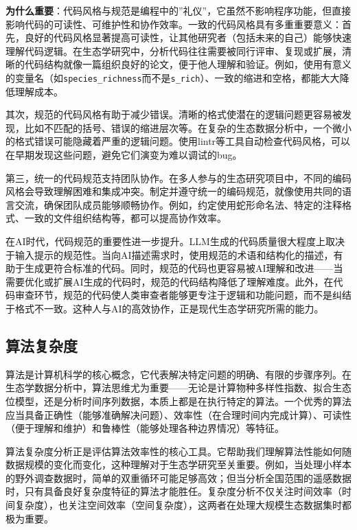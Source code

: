 \documentclass[
  twoside]{book}
\begin{document}
\textbf{为什么重要}：代码风格与规范是编程中的''礼仪''，它虽然不影响程序功能，但直接影响代码的可读性、可维护性和协作效率。一致的代码风格具有多重重要意义：首先，良好的代码风格显著提高可读性，让其他研究者（包括未来的自己）能够快速理解代码逻辑。在生态学研究中，分析代码往往需要被同行评审、复现或扩展，清晰的代码结构就像一篇组织良好的论文，便于他人理解和验证。例如，使用有意义的变量名（如\texttt{species\_richness}而不是\texttt{s\_rich}）、一致的缩进和空格，都能大大降低理解成本。

其次，规范的代码风格有助于减少错误。清晰的格式使潜在的逻辑问题更容易被发现，比如不匹配的括号、错误的缩进层次等。在复杂的生态数据分析中，一个微小的格式错误可能隐藏着严重的逻辑问题。使用lintr等工具自动检查代码风格，可以在早期发现这些问题，避免它们演变为难以调试的bug。

第三，统一的代码规范支持团队协作。在多人参与的生态研究项目中，不同的编码风格会导致理解困难和集成冲突。制定并遵守统一的编码规范，就像使用共同的语言交流，确保团队成员能够顺畅协作。例如，约定使用蛇形命名法、特定的注释格式、一致的文件组织结构等，都可以提高协作效率。

在AI时代，代码规范的重要性进一步提升。LLM生成的代码质量很大程度上取决于输入提示的规范性。当向AI描述需求时，使用规范的术语和结构化的描述，有助于生成更符合标准的代码。同时，规范的代码也更容易被AI理解和改进------当需要优化或扩展AI生成的代码时，规范的代码结构降低了理解难度。此外，在代码审查环节，规范的代码使人类审查者能够更专注于逻辑和功能问题，而不是纠结于格式不一致。这种人与AI的高效协作，正是现代生态学研究所需的能力。

\hypertarget{ux7b97ux6cd5ux590dux6742ux5ea6}{%
\subsection{算法复杂度}\label{ux7b97ux6cd5ux590dux6742ux5ea6}}

算法是计算机科学的核心概念，它代表解决特定问题的明确、有限的步骤序列。在生态学数据分析中，算法思维尤为重要------无论是计算物种多样性指数、拟合生态位模型，还是分析时间序列数据，本质上都是在执行特定的算法。一个优秀的算法应当具备正确性（能够准确解决问题）、效率性（在合理时间内完成计算）、可读性（便于理解和维护）和鲁棒性（能够处理各种边界情况）等特征。

算法复杂度分析正是评估算法效率性的核心工具。它帮助我们理解算法性能如何随数据规模的变化而变化，这种理解对于生态学研究至关重要。例如，当处理小样本的野外调查数据时，简单的双重循环可能足够高效；但当分析全国范围的遥感数据时，只有具备良好复杂度特征的算法才能胜任。复杂度分析不仅关注时间效率（时间复杂度），也关注空间效率（空间复杂度），这两者在处理大规模生态数据集时都极为重要。
\end{document}

